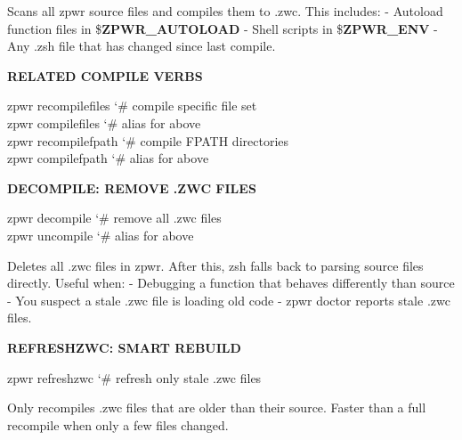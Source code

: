 \documentclass[11pt,a4paper,twoside]{book}
\begin{document}
Scans all zpwr source files and compiles them to .zwc. This includes: - Autoload function files in \$\textbf{ZPWR\_AUTOLOAD} - Shell scripts in \$\textbf{ZPWR\_ENV} - Any .zsh file that has changed since last compile.


\vspace{12pt}
{\bfseries\color{neonyellow} RELATED COMPILE VERBS}\vspace{4pt}

\begin{codebox}
\color{neongreen}zpwr recompilefiles                 {\char`\#} compile specific file set\\
\color{neongreen}zpwr compilefiles                   {\char`\#} alias for above\\
\color{neongreen}zpwr recompilefpath                 {\char`\#} compile FPATH directories\\
\color{neongreen}zpwr compilefpath                   {\char`\#} alias for above\\
\end{codebox}


\vspace{12pt}
{\bfseries\color{neonyellow} DECOMPILE: REMOVE .ZWC FILES}\vspace{4pt}

\begin{codebox}
\color{neongreen}zpwr decompile                      {\char`\#} remove all .zwc files\\
\color{neongreen}zpwr uncompile                      {\char`\#} alias for above\\
\end{codebox}

Deletes all .zwc files in zpwr. After this, zsh falls back to parsing source files directly. Useful when: - Debugging a function that behaves differently than source - You suspect a stale .zwc file is loading old code - zpwr doctor reports stale .zwc files.


\vspace{12pt}
{\bfseries\color{neonyellow} REFRESHZWC: SMART REBUILD}\vspace{4pt}

\begin{codebox}
\color{neongreen}zpwr refreshzwc                     {\char`\#} refresh only stale .zwc files\\
\end{codebox}

Only recompiles .zwc files that are older than their source. Faster than a full recompile when only a few files changed.
\end{document}
